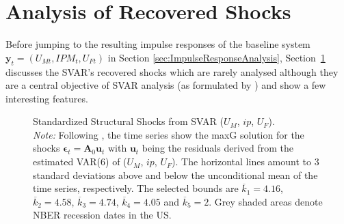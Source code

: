 \documentclass[a4paper,11pt,listof=nochaptergap,oneside,pointednumbers,bibtotoc,bigheadings,liststotoc,hidelinks]{scrbook}
\theoremstyle{mysatz}
\theoremstyle{mydefinition}
\theoremstyle{mytheorem}
\theoremstyle{mybemerkung}
\newcommand{\vect}[1]{\boldsymbol{\mathbf{#1}}}
\begin{document}
\section{Analysis of Recovered Shocks}
\label{sec:uncertaintyShocks}

Before jumping to the resulting impulse responses of the baseline system $\vect{y}_t = (U_{Mt}, IPM_{t}, U_{Ft})$ in Section \ref{sec:ImpulseResponseAnalysis}, Section~\ref{sec:uncertaintyShocks} discusses the SVAR's recovered shocks which are rarely analysed although they are a central objective of SVAR analysis (as formulated by \citealp{ludvigsonetal:20a}) and show a few interesting features.\\


\begin{figure}[!h]
   \centering
   \setlength\fboxsep{0pt}
   \setlength\fboxrule{0pt}
      \caption[Standardized Structural Shocks from SVAR ($U_{M}$, $ip$, $U_{F}$).]{Standardized Structural Shocks from SVAR ($U_{M}$, $ip$, $U_{F}$).\\
      \textit{Note:}  Following \citet{ludvigsonetal:18}, the time series show the maxG solution for the shocks $\vect{\epsilon}_t = \vect{A}_0\vect{u}_t$ with $\vect{u}_t$ being the residuals derived from the estimated VAR(6) of ($U_{M}$, $ip$, $U_{F}$). The horizontal lines amount to 3 standard deviations above and below the unconditional mean of the time series, respectively. The selected bounds are $\overline{k}_1 = 4.16$, $\overline{k}_2 = 4.58$, $\overline{k}_3 = 4.74$, $\overline{k}_4 = 4.05$ and $\overline{k}_5 = 2$. Grey shaded areas denote NBER recession dates in the US.}   \label{fig:ludvigsonetal_timeseries_e_shocks}
\end{figure}
\end{document}

